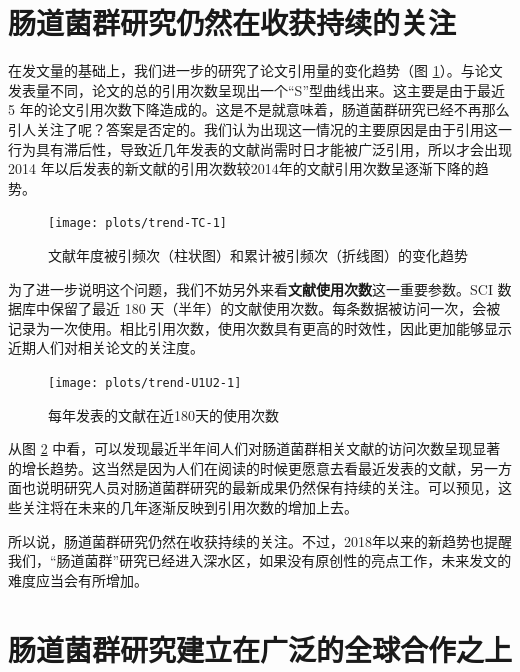 \documentclass[]{ctexbook}
\begin{document}
\hypertarget{ux80a0ux9053ux83ccux7fa4ux7814ux7a76ux4ecdux7136ux5728ux6536ux83b7ux6301ux7eedux7684ux5173ux6ce8}{%
\section{肠道菌群研究仍然在收获持续的关注}\label{ux80a0ux9053ux83ccux7fa4ux7814ux7a76ux4ecdux7136ux5728ux6536ux83b7ux6301ux7eedux7684ux5173ux6ce8}}

在发文量的基础上，我们进一步的研究了论文引用量的变化趋势（图 \ref{fig:trend-TC}）。与论文发表量不同，论文的总的引用次数呈现出一个``S''型曲线出来。这主要是由于最近 5 年的论文引用次数下降造成的。这是不是就意味着，肠道菌群研究已经不再那么引人关注了呢？答案是否定的。我们认为出现这一情况的主要原因是由于引用这一行为具有滞后性，导致近几年发表的文献尚需时日才能被广泛引用，所以才会出现 2014 年以后发表的新文献的引用次数较2014年的文献引用次数呈逐渐下降的趋势。

\begin{figure}
\texttt{[image: plots/trend-TC-1]} \caption{文献年度被引频次（柱状图）和累计被引频次（折线图）的变化趋势}\label{fig:trend-TC}
\end{figure}

为了进一步说明这个问题，我们不妨另外来看\textbf{文献使用次数}这一重要参数。SCI 数据库中保留了最近 180 天（半年）的文献使用次数。每条数据被访问一次，会被记录为一次使用。相比引用次数，使用次数具有更高的时效性，因此更加能够显示近期人们对相关论文的关注度。

\begin{figure}
\texttt{[image: plots/trend-U1U2-1]} \caption{每年发表的文献在近180天的使用次数}\label{fig:trend-U1U2}
\end{figure}

从图 \ref{fig:trend-U1U2} 中看，可以发现最近半年间人们对肠道菌群相关文献的访问次数呈现显著的增长趋势。这当然是因为人们在阅读的时候更愿意去看最近发表的文献，另一方面也说明研究人员对肠道菌群研究的最新成果仍然保有持续的关注。可以预见，这些关注将在未来的几年逐渐反映到引用次数的增加上去。

所以说，肠道菌群研究仍然在收获持续的关注。不过，2018年以来的新趋势也提醒我们，``肠道菌群''研究已经进入深水区，如果没有原创性的亮点工作，未来发文的难度应当会有所增加。

\hypertarget{ux80a0ux9053ux83ccux7fa4ux7814ux7a76ux5efaux7acbux5728ux5e7fux6cdbux7684ux5168ux7403ux5408ux4f5cux4e4bux4e0a}{%
\section{肠道菌群研究建立在广泛的全球合作之上}\label{ux80a0ux9053ux83ccux7fa4ux7814ux7a76ux5efaux7acbux5728ux5e7fux6cdbux7684ux5168ux7403ux5408ux4f5cux4e4bux4e0a}}
\end{document}
